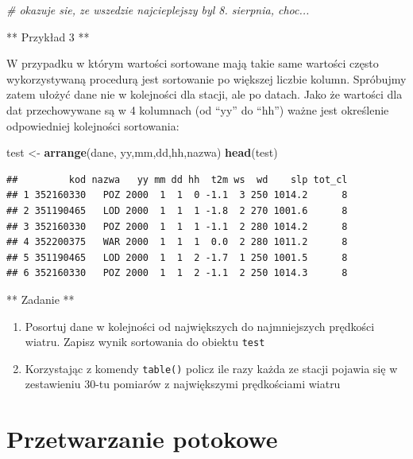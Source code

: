 \documentclass[]{book}
\newenvironment{Shaded}{\begin{snugshade}}{\end{snugshade}}
\newcommand{\KeywordTok}[1]{\textcolor[rgb]{0.13,0.29,0.53}{\textbf{#1}}}
\newcommand{\StringTok}[1]{\textcolor[rgb]{0.31,0.60,0.02}{#1}}
\newcommand{\CommentTok}[1]{\textcolor[rgb]{0.56,0.35,0.01}{\textit{#1}}}
\newcommand{\NormalTok}[1]{#1}
\providecommand{\tightlist}{%
  \setlength{\itemsep}{0pt}\setlength{\parskip}{0pt}}
\theoremstyle{definition}
\theoremstyle{definition}
\theoremstyle{definition}
\theoremstyle{remark}
\begin{document}
\begin{Shaded}
\begin{Highlighting}[]
\CommentTok{# okazuje sie, ze wszedzie najcieplejszy byl 8. sierpnia, choc...}
\end{Highlighting}
\end{Shaded}

** Przykład 3 **

W przypadku w którym wartości sortowane mają takie same wartości często
wykorzystywaną procedurą jest sortowanie po większej liczbie kolumn.
Spróbujmy zatem ułożyć dane nie w kolejności dla stacji, ale po datach.
Jako że wartości dla dat przechowywane są w 4 kolumnach (od ``yy'' do
``hh'') ważne jest określenie odpowiedniej kolejności sortowania:

\begin{Shaded}
\begin{Highlighting}[]
\NormalTok{test <-}\StringTok{ }\KeywordTok{arrange}\NormalTok{(dane, yy,mm,dd,hh,nazwa)}
\KeywordTok{head}\NormalTok{(test)}
\end{Highlighting}
\end{Shaded}

\begin{verbatim}
##         kod nazwa   yy mm dd hh  t2m ws  wd    slp tot_cl
## 1 352160330   POZ 2000  1  1  0 -1.1  3 250 1014.2      8
## 2 351190465   LOD 2000  1  1  1 -1.8  2 270 1001.6      8
## 3 352160330   POZ 2000  1  1  1 -1.1  2 280 1014.2      8
## 4 352200375   WAR 2000  1  1  1  0.0  2 280 1011.2      8
## 5 351190465   LOD 2000  1  1  2 -1.7  1 250 1001.5      8
## 6 352160330   POZ 2000  1  1  2 -1.1  2 250 1014.3      8
\end{verbatim}

** Zadanie **

\begin{enumerate}
\def\labelenumi{\arabic{enumi}.}
\tightlist
\item
  Posortuj dane w kolejności od największych do najmniejszych prędkości
  wiatru. Zapisz wynik sortowania do obiektu \texttt{test}
\item
  Korzystając z komendy \texttt{table()} policz ile razy każda ze stacji
  pojawia się w zestawieniu 30-tu pomiarów z największymi prędkościami
  wiatru
\end{enumerate}

\section{Przetwarzanie potokowe}\label{przetwarzanie-potokowe}
\end{document}
